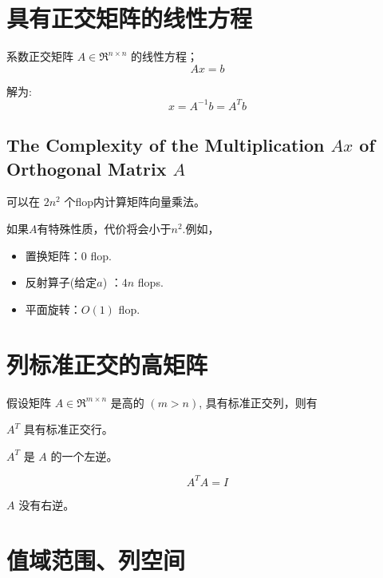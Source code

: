 \section{具有正交矩阵的线性方程}

系数正交矩阵 $ A \in \mathfrak{R}^{n \times n} $ 的线性方程；
\begin{equation}
A x=b
\end{equation}

解为:
\begin{equation}
x=A^{-1} b=A^{T} b
\end{equation}


\subsection{The Complexity of the Multiplication $Ax$ of Orthogonal Matrix $A$}
\label{complexity:Qx}
可以在 $ 2  {n}^{2} $ 个flop内计算矩阵向量乘法。 

如果$A$有特殊性质，代价将会小于$n^2$.例如，

\begin{itemize}
    \item 置换矩阵：$0$ flop.
    \item 反射算子(给定$a$) ：$4n$ flops.
    \item 平面旋转：$O(1)$ flop.
\end{itemize}

\section{列标准正交的高矩阵}

\begin{theorem}
    假设矩阵 $ A \in \mathfrak{R}^{m \times n} $ 是高的 $ ({m}>{n}) $, 具有标准正交列，则有

    $ A^{T} $ 具有标准正交行。
\end{theorem}

\begin{theorem}
    $ A^{T} $ 是 $ A $ 的一个左逆。

    \begin{equation}A^T A =I\end{equation}
\end{theorem}

\begin{theorem}
    $ A $ 没有右逆。
\end{theorem}

\section{值域范围、列空间}

